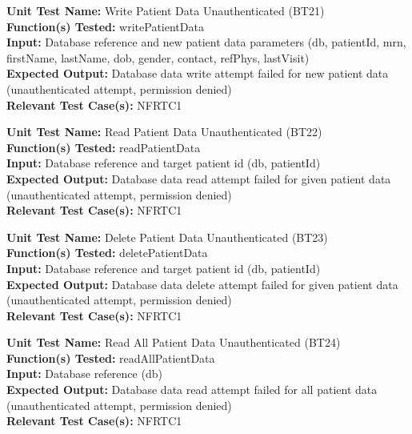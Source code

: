 \documentclass[12pt, titlepage]{article}
\begin{document}
\begin{mdframed}[linewidth=0.5mm]
  \textbf{Unit Test Name:} Write Patient Data Unauthenticated (BT21) \\
  \textbf{Function(s) Tested:} writePatientData \\
  \textbf{Input:} Database reference and new patient data parameters (db, patientId, mrn, firstName, lastName, dob, gender, contact, refPhys, lastVisit) \\
  \textbf{Expected Output:} Database data write attempt failed for new patient data (unauthenticated attempt, permission denied) \\
  \textbf{Relevant Test Case(s):} NFRTC1
\end{mdframed}

\begin{mdframed}[linewidth=0.5mm]
  \textbf{Unit Test Name:} Read Patient Data Unauthenticated (BT22) \\
  \textbf{Function(s) Tested:} readPatientData \\
  \textbf{Input:} Database reference and target patient id (db, patientId) \\
  \textbf{Expected Output:} Database data read attempt failed for given patient data (unauthenticated attempt, permission denied) \\
  \textbf{Relevant Test Case(s):} NFRTC1
\end{mdframed}

\begin{mdframed}[linewidth=0.5mm]
  \textbf{Unit Test Name:} Delete Patient Data Unauthenticated (BT23) \\
  \textbf{Function(s) Tested:} deletePatientData \\
  \textbf{Input:} Database reference and target patient id (db, patientId) \\
  \textbf{Expected Output:} Database data delete attempt failed for given patient data (unauthenticated attempt, permission denied) \\
  \textbf{Relevant Test Case(s):} NFRTC1
\end{mdframed}

\begin{mdframed}[linewidth=0.5mm]
  \textbf{Unit Test Name:} Read All Patient Data Unauthenticated (BT24) \\
  \textbf{Function(s) Tested:} readAllPatientData \\
  \textbf{Input:} Database reference (db) \\
  \textbf{Expected Output:} Database data read attempt failed for all patient data (unauthenticated attempt, permission denied) \\
  \textbf{Relevant Test Case(s):} NFRTC1
\end{mdframed}
\end{document}
